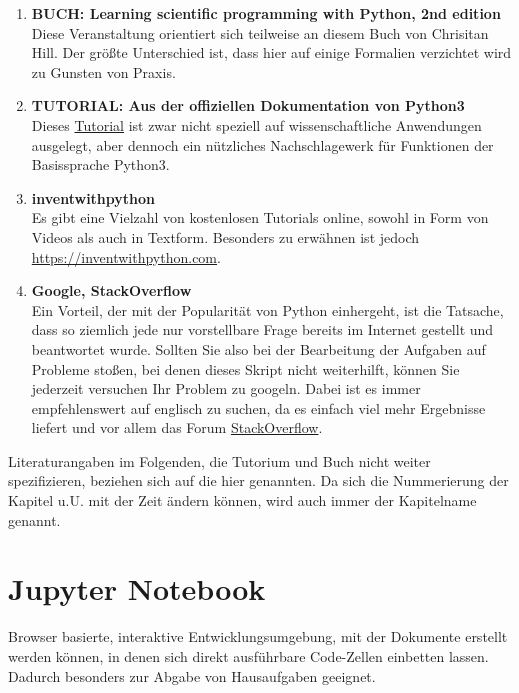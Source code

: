 \begin{enumerate}

\item \textbf{BUCH: Learning scientific programming with Python, 2nd edition} \\
Diese Veranstaltung orientiert sich teilweise an diesem Buch von Chrisitan Hill. 
Der gr\"oßte Unterschied ist, dass hier auf einige Formalien verzichtet wird zu Gunsten von Praxis.

\item \textbf{TUTORIAL: Aus der offiziellen Dokumentation von Python3} \\
Dieses \href{https://docs.python.org/3/tutorial/}{Tutorial} ist zwar nicht speziell auf wissenschaftliche Anwendungen ausgelegt, aber dennoch ein n\"utzliches Nachschlagewerk f\"ur Funktionen der Basissprache Python3.

\item \textbf{inventwithpython} \\
Es gibt eine Vielzahl von kostenlosen Tutorials online, sowohl in Form von Videos als auch in Textform.
Besonders zu erw\"ahnen ist jedoch \url{https://inventwithpython.com}.

\item \textbf{Google, StackOverflow} \\
Ein Vorteil, der mit der Popularit\"at von Python einhergeht, ist die Tatsache, dass so ziemlich jede nur vorstellbare Frage bereits im Internet gestellt und beantwortet wurde.
Sollten Sie also bei der Bearbeitung der Aufgaben auf Probleme stoßen, bei denen dieses Skript nicht weiterhilft, k\"onnen Sie jederzeit versuchen Ihr Problem zu googeln.
Dabei ist es immer empfehlenswert auf englisch zu suchen, da es einfach viel mehr Ergebnisse liefert und vor allem das Forum \href{https://stackoverflow.com}{StackOverflow}.
\end{enumerate}

Literaturangaben im Folgenden, die  Tutorium und Buch nicht weiter spezifizieren, beziehen sich auf die hier genannten. 
%
Da sich die Nummerierung der Kapitel u.U. mit der Zeit ändern können, wird auch immer der Kapitelname genannt. 



\section{Jupyter Notebook}

Browser basierte, interaktive Entwicklungsumgebung, mit der Dokumente erstellt werden können, in denen sich direkt ausf\"uhrbare Code-Zellen einbetten lassen. 
Dadurch besonders zur Abgabe von Hausaufgaben geeignet.

